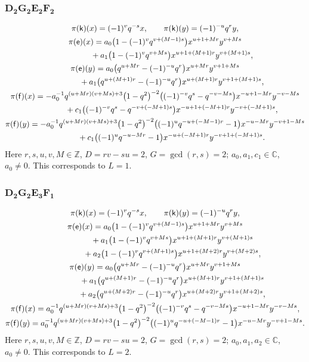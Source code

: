 \documentclass[10pt,a4paper]{amsart}
\numberwithin{equation}{section}
\begin{document}
\subsubsection*{$\boldsymbol{D_2G_2E_2F_2}$}
\begin{gather*}
\pi(\mathsf{k})(x)= (-1)^vq^{-s}x ,\qquad\pi(\mathsf{k})(y)=(-1)^{-u}q^ry ,\\
\pi(\mathsf{e})(x)= a_0\big(1-(-1)^vq^{v+(M-1)s}\big)x^{u+1+Mr}y^{v+Ms}\\
\hphantom{\pi(\mathsf{e})(x)=}{}+ a_1\big(1-(-1)^vq^{v+Ms}\big)x^{u+1+(M+1)r}y^{v+(M+1)s} ,\\
\pi(\mathsf{e})(y)= a_0\big(q^{u+Mr}-(-1)^{-u}q^r\big)x^{u+Mr}y^{v+1+Ms}\\
\hphantom{\pi(\mathsf{e})(y)=}{} + a_1\big(q^{u+(M+1)r}-(-1)^{-u}q^r\big)x^{u+(M+1)r}y^{v+1+(M+1)s} ,\\
\pi(\mathsf{f})(x)= -a_0^{-1}q^{(u+Mr)(v+Ms)+3}\big(1-q^2\big)^{-2}\big((-1)^{-v}q^s-q^{-v-Ms}\big)x^{-u+1-Mr}y^{-v-Ms}\\
\hphantom{\pi(\mathsf{f})(x)=}{} + c_1\big((-1)^{-v}q^s-q^{-v+(-M+1)s}\big)x^{-u+1+(-M+1)r}y^{-v+(-M+1)s} ,\\
\pi(\mathsf{f})(y)= -a_0^{-1}q^{(u+Mr)(v+Ms)+3}\big(1-q^2\big)^{-2}\big((-1)^uq^{-u+(-M-1)r}-1\big) x^{-u-Mr}y^{-v+1-Ms}\\
\hphantom{\pi(\mathsf{f})(y)=}{} + c_1\big((-1)^uq^{-u-Mr}-1\big)x^{-u+(-M+1)r}y^{-v+1+(-M+1)s} .
\end{gather*}
Here $r,s,u,v,M\in\mathbb{Z}$, $D=rv-su=2$, $G=\operatorname{gcd}(r,s)=2$; $a_0,a_1,c_1\in\mathbb{C}$, $a_0\ne 0$. This corresponds to $L=1$.

\subsubsection*{$\boldsymbol{D_2G_2E_3F_1}$}
\begin{gather*}
\pi(\mathsf{k})(x)= (-1)^vq^{-s}x ,\qquad\pi(\mathsf{k})(y)=(-1)^{-u}q^ry ,\\
\pi(\mathsf{e})(x)= a_0\big(1-(-1)^vq^{v+(M-1)s}\big)x^{u+1+Mr}y^{v+Ms}\\
\hphantom{\pi(\mathsf{e})(x)=}{}+ a_1\big(1-(-1)^vq^{v+Ms}\big)x^{u+1+(M+1)r}y^{v+(M+1)s}\\
\hphantom{\pi(\mathsf{e})(x)=}{}+ a_2\big(1-(-1)^vq^{v+(M+1)s}\big)x^{u+1+(M+2)r}y^{v+(M+2)s} ,\\
\pi(\mathsf{e})(y)= a_0\big(q^{u+Mr}-(-1)^{-u}q^r\big)x^{u+Mr}y^{v+1+Ms}\\
\hphantom{\pi(\mathsf{e})(y)=}{} + a_1\big(q^{u+(M+1)r}-(-1)^{-u}q^r\big)x^{u+(M+1)r}y^{v+1+(M+1)s}\\
\hphantom{\pi(\mathsf{e})(y)=}{} + a_2\big(q^{u+(M+2)r}-(-1)^{-u}q^r\big)x^{u+(M+2)r}y^{v+1+(M+2)s} ,\\
\pi(\mathsf{f})(x)= a_0^{-1}q^{(u+Mr)(v+Ms)+3}\big(1-q^2\big)^{-2}\big((-1)^{-v}q^s-q^{-v-Ms}\big)x^{-u+1-Mr}y^{-v-Ms} ,\\
\pi(\mathsf{f})(y)= a_0^{-1}q^{(u+Mr)(v+Ms)+3}\big(1-q^2\big)^{-2}\big((-1)^uq^{-u+(-M-1)r}-1\big)x^{-u-Mr}y^{-v+1-Ms} .
\end{gather*}
Here $r,s,u,v,M\in\mathbb{Z}$, $D=rv-su=2$, $G=\operatorname{gcd}(r,s)=2$; $a_0,a_1,a_2\in\mathbb{C}$, $a_0\ne 0$. This corresponds to $L=2$.
\end{document}
